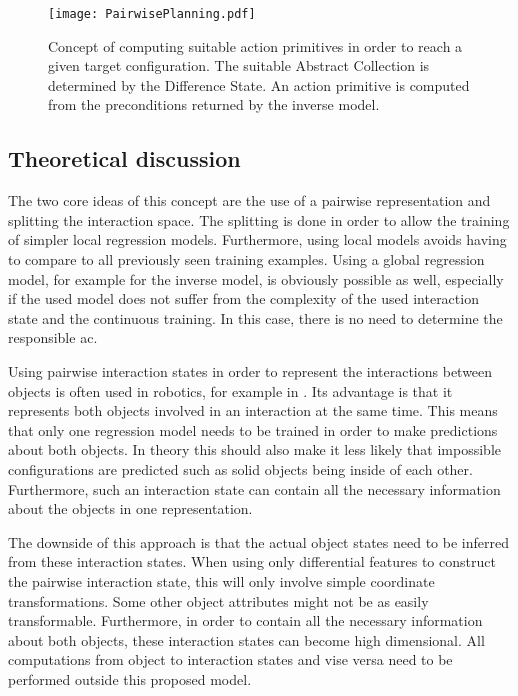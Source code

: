 \begin{figure}
	\centering
	\texttt{[image: PairwisePlanning.pdf]}
	\caption{Concept of computing suitable action primitives in order to reach a given target configuration. The suitable Abstract Collection is determined by the Difference State. An action primitive is computed from the preconditions returned by the inverse model.} 
	\label{fig:PairPlanning}
\end{figure}


\subsection{Theoretical discussion \label{sec:interactionTheory}}
The two core ideas of this concept are the use of a pairwise representation and splitting the interaction space. The splitting is done in order to allow the training of simpler local regression models. Furthermore, using local models avoids having to compare to all previously seen training examples. 
Using a global regression model, for example for the inverse model, is obviously possible as well, especially if the used model does not suffer from the complexity of the used interaction state and the continuous training. In this case, there is no need to determine the responsible \acrlong{ac}.

Using pairwise interaction states in order to represent the interactions between objects is often used in robotics, for example in \cite{pairwiseExamples}. 
Its advantage is that it represents both objects involved in an interaction at the same time. This means that only one regression model needs to be trained in order to make predictions about both objects. In theory this should also make it less likely that impossible configurations are predicted such as solid objects being inside of each other. Furthermore, such an interaction state can contain all the necessary information about the objects in one representation. 

The downside of this approach is that the actual object states need to be inferred from these interaction states. When using only differential features to construct the pairwise interaction state, this will only involve simple coordinate transformations. Some other object attributes might not be as easily transformable. Furthermore, in order to contain all the necessary information about both objects, these interaction states can become high dimensional. All computations from object to interaction states and vise versa need to be performed outside this proposed model.

